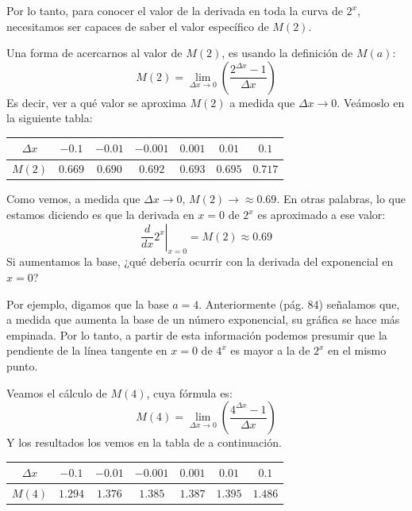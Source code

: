 \documentclass[12pt]{article}
\begin{document}
Por lo tanto, para conocer el valor de la derivada en toda la curva de $2^{x}$, necesitamos ser capaces de saber el valor específico de $M(2)$.

Una forma de acercarnos al valor de $M(2)$, es usando la definición de $M(a)$:
\[M(2) = \lim_{\Delta x \to 0} \left(\frac{2^{\Delta x} - 1}{\Delta x}\right)\]
Es decir, ver a qué valor se aproxima $M(2)$ a medida que $\Delta x \to 0$. Veámoslo en la siguiente tabla:

\begin{table}[hbt!]
\centering

\begin{tabular}{c | c c c c c c}
$\Delta x$ & $-0.1$ & $-0.01$ & $-0.001$ & $0.001$ & $0.01$ & $0.1$\\
\hline
$M(2)$ & $0.669$ & $0.690$ & $0.692$ & $0.693$ & $0.695$ & $0.717$
\end{tabular}

\end{table}

Como vemos, a medida que $\Delta x \to 0$, $M(2) \to \approx 0.69$. En otras palabras, lo que estamos diciendo es que la derivada en $x = 0$ de $2^{x}$ es aproximado a ese valor:
\[\left. \frac{d}{dx} 2^{x} \right |_{x = 0} = M(2) \approx 0.69\]
Si aumentamos la base, ¿qué debería ocurrir con la derivada del exponencial en $x = 0$?

Por ejemplo, digamos que la base $a = 4$. Anteriormente (pág. 84) señalamos que, a medida que aumenta la base de un número exponencial, su gráfica se hace más empinada. Por lo tanto, a partir de esta información podemos presumir que la pendiente de la línea tangente en $x = 0$ de $4^{x}$ es mayor a la de $2^{x}$ en el mismo punto.

Veamos el cálculo de $M(4)$, cuya fórmula es:
\[M(4) = \lim_{\Delta x \to 0} \left(\frac{4^{\Delta x} - 1}{\Delta x}\right)\]
Y los resultados los vemos en la tabla de a continuación.

\newpage

\begin{table}[hbt!]
\centering

\begin{tabular}{c | c c c c c c}
$\Delta x$ & $-0.1$ & $-0.01$ & $-0.001$ & $0.001$ & $0.01$ & $0.1$\\
\hline
$M(4)$ & $1.294$ & $1.376$ & $1.385$ & $1.387$ & $1.395$ & $1.486$
\end{tabular}

\end{table}
\end{document}

